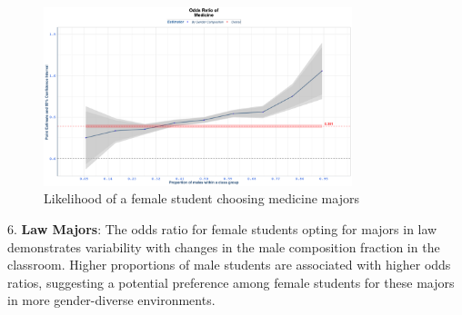 \begin{figure}[H]
\centering
\includegraphics[width=0.8\textwidth]{Graph/Results/fe_panel_student_gender_composition_wome_in_MEDICINE_bce.png}
\caption{Likelihood of a female student choosing medicine majors}
\label{fig:medicine}
\end{figure}

6. \textbf{Law Majors}: The odds ratio for female students opting for majors in law demonstrates variability with changes in the male composition fraction in the classroom. Higher proportions of male students are associated with higher odds ratios, suggesting a potential preference among female students for these majors in more gender-diverse environments.

